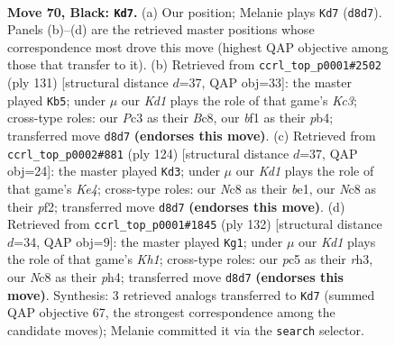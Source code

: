 \documentclass[11pt]{article}
\begin{document}
\clearpage

\begin{figure}[p]\centering
\begin{subfigure}{0.46\textwidth}\centering
\resizebox{\linewidth}{!}{%
\newchessgame
\chessboard[
  setfen={R1nk4/5r1p/P7/2P5/8/2p4P/2P3P1/4KB2 b - - 4 70},
  showmover=false,
  pgfstyle=straightmove, color=movearrow, markmove={d8-d7}
]}
\caption{}
\end{subfigure}\hfill
\begin{subfigure}{0.46\textwidth}\centering
\resizebox{\linewidth}{!}{%
\newchessgame
\chessboard[
  setfen={2b5/8/2k1n2R/6p1/1Pp5/2Pn1P2/6PK/B7 b - - 2 66},
  showmover=false,
  pgfstyle=straightmove, color=movearrow, markmove={c6-b5}
]}
\caption{}
\end{subfigure}
\\[4pt]
\begin{subfigure}{0.46\textwidth}\centering
\resizebox{\linewidth}{!}{%
\newchessgame
\chessboard[
  setfen={7r/P7/3N1k2/2pP4/1p2K3/1P6/5p2/4bR2 w - - 3 63},
  showmover=false,
  pgfstyle=straightmove, color=movearrow, markmove={e4-d3}
]}
\caption{}
\end{subfigure}\hfill
\begin{subfigure}{0.46\textwidth}\centering
\resizebox{\linewidth}{!}{%
\newchessgame
\chessboard[
  setfen={8/3bk3/N6R/1p1Bp3/4P1pp/7r/8/7K w - - 4 67},
  showmover=false,
  pgfstyle=straightmove, color=movearrow, markmove={h1-g1}
]}
\caption{}
\end{subfigure}
\caption{\textbf{Move 70, Black: \texttt{Kd7}.} (a) Our position; Melanie plays \texttt{Kd7} (\texttt{d8d7}). Panels (b)--(d) are the retrieved master positions whose correspondence most drove this move (highest QAP objective among those that transfer to it). (b) Retrieved from \texttt{ccrl\_top\_p0001\#2502} (ply 131) [structural distance $d$=37, QAP obj=33]: the master played \texttt{Kb5}; under $\mu$ our \emph{Kd1} plays the role of that game's \emph{Kc3}; cross-type roles: our \emph{P}c3 as their \emph{B}c8, our \emph{b}f1 as their \emph{p}b4; transferred move \texttt{d8d7} \textbf{(endorses this move)}. (c) Retrieved from \texttt{ccrl\_top\_p0002\#881} (ply 124) [structural distance $d$=37, QAP obj=24]: the master played \texttt{Kd3}; under $\mu$ our \emph{Kd1} plays the role of that game's \emph{Ke4}; cross-type roles: our \emph{N}c8 as their \emph{b}e1, our \emph{N}c8 as their \emph{p}f2; transferred move \texttt{d8d7} \textbf{(endorses this move)}. (d) Retrieved from \texttt{ccrl\_top\_p0001\#1845} (ply 132) [structural distance $d$=34, QAP obj=9]: the master played \texttt{Kg1}; under $\mu$ our \emph{Kd1} plays the role of that game's \emph{Kh1}; cross-type roles: our \emph{p}c5 as their \emph{r}h3, our \emph{N}c8 as their \emph{p}h4; transferred move \texttt{d8d7} \textbf{(endorses this move)}. Synthesis: 3 retrieved analogs transferred to \texttt{Kd7} (summed QAP objective 67, the strongest correspondence among the candidate moves); Melanie committed it via the \texttt{search} selector.}
\label{fig:thought-m139}
\end{figure}
\end{document}
